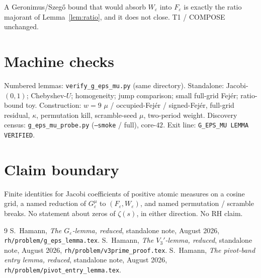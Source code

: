 \documentclass[11pt]{article}
\theoremstyle{remark}
\newcommand{\eps}{\varepsilon}
\begin{document}
A Geronimus/Szeg\H{o} bound that would absorb $W_\eps$ into
$F_\eps$ is exactly the ratio majorant of Lemma~\ref{lem:ratio},
and it does not close.
T1 / COMPOSE unchanged.

\section{Machine checks}\label{sec:machine}

Numbered lemmas: \texttt{verify\_g\_eps\_mu.py} (same directory).
Standalone: Jacobi-$(0,1)$; Chebyshev-$U$; homogeneity; jump
comparison; small full-grid Fej\'er; ratio-bound toy.
Construction: $w=9$ $\mu$ / occupied-Fej\'er / signed-Fej\'er,
full-grid residual, $\kappa$, permutation kill, scramble-seed
$\mu$, two-period weight.
Discovery census: \texttt{g\_eps\_mu\_probe.py}
(\texttt{--smoke} / full), core-$42$.
Exit line: \texttt{G\_EPS\_MU LEMMA VERIFIED}.

\section*{Claim boundary}

Finite identities for Jacobi coefficients of positive atomic
measures on a cosine grid, a named reduction of $G_\varepsilon^\mu$
to $(F_\eps,W_\eps)$, and named permutation / scramble breaks.
No statement about zeros of $\zeta(s)$, in either direction.
No RH claim.

\begin{thebibliography}{9}
S.~Hamann,
\textit{The $G_\varepsilon$-lemma, reduced},
standalone note, August 2026,
\texttt{rh/problem/g\_eps\_lemma.tex}.
S.~Hamann,
\textit{The $V_3'$-lemma, reduced},
standalone note, August 2026,
\texttt{rh/problem/v3prime\_proof.tex}.
S.~Hamann,
\textit{The pivot-band entry lemma, reduced},
standalone note, August 2026,
\texttt{rh/problem/pivot\_entry\_lemma.tex}.
\end{thebibliography}
\end{document}
